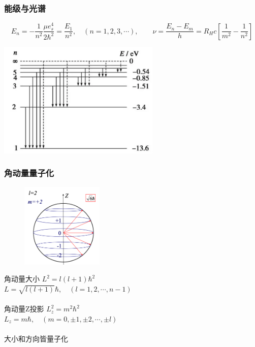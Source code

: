 \begin{frame}
	  \frametitle{能级与光谱}
	  \[ E_n = - \frac{1}{n^2} \frac{\mu e^4 _s }{2 \hbar ^2} =\frac{E_1}{n^2}, \quad (n=1,2,3,\cdots) , \qquad \nu=\frac{E_n -E_m}{h} = R_H c [\frac{1}{m^2} -\frac{1}{n^2}]
	  \]
	  \begin{center}
		   \includegraphics[width=0.58\textwidth]{figs/2022-03-28-23-37-55.png}
	  \end{center}
\end{frame}

\begin{frame} 
    \frametitle{角动量量子化}
    \begin{figure} %
        \includegraphics[width=0.35\textwidth]{figs/LandL2.png}   
    \end{figure}
    {\Bullet} 角动量大小  $L^2=l(l+1) \hbar^2$\\
	$L=\sqrt{l(l+1)}\hbar, \quad (l=1,2,\cdots, n-1)$\\
    ~~\\ \vspace{0.3em}
    {\Bullet} 角动量Z投影 $L^2_z=m^2\hbar^2$\\
    $L_z=m\hbar, \quad (m=0,\pm 1,\pm 2, \cdots, \pm l)$\\
	~~\\
    {\Bullet} 大小和方向皆量子化
\end{frame} 

